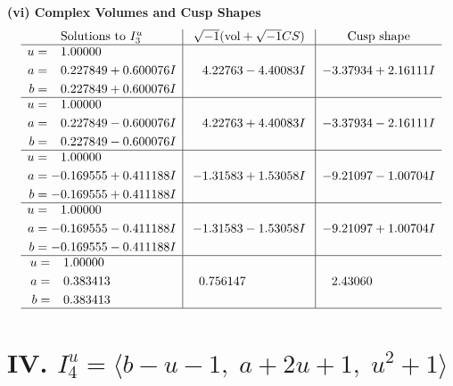 \documentclass[1p]{elsarticle_modified}
\theoremstyle{definition}
\newcommand{\I}{\sqrt{-1}}
\begin{document}
\newpage\flushleft \textbf{(vi) Complex Volumes and Cusp Shapes}
$$\begin{array}{c|c|c}  
\text{Solutions to }I^u_{3}& \I (\text{vol} + \sqrt{-1}CS) & \text{Cusp shape}\\
 \hline 
\begin{aligned}
u &= \phantom{-}1.00000\phantom{ +0.000000I} \\
a &= \phantom{-}0.227849 + 0.600076 I \\
b &= \phantom{-}0.227849 + 0.600076 I\end{aligned}
 & \phantom{-}4.22763 - 4.40083 I & -3.37934 + 2.16111 I \\ \hline\begin{aligned}
u &= \phantom{-}1.00000\phantom{ +0.000000I} \\
a &= \phantom{-}0.227849 - 0.600076 I \\
b &= \phantom{-}0.227849 - 0.600076 I\end{aligned}
 & \phantom{-}4.22763 + 4.40083 I & -3.37934 - 2.16111 I \\ \hline\begin{aligned}
u &= \phantom{-}1.00000\phantom{ +0.000000I} \\
a &= -0.169555 + 0.411188 I \\
b &= -0.169555 + 0.411188 I\end{aligned}
 & -1.31583 + 1.53058 I & -9.21097 - 1.00704 I \\ \hline\begin{aligned}
u &= \phantom{-}1.00000\phantom{ +0.000000I} \\
a &= -0.169555 - 0.411188 I \\
b &= -0.169555 - 0.411188 I\end{aligned}
 & -1.31583 - 1.53058 I & -9.21097 + 1.00704 I \\ \hline\begin{aligned}
u &= \phantom{-}1.00000\phantom{ +0.000000I} \\
a &= \phantom{-}0.383413\phantom{ +0.000000I} \\
b &= \phantom{-}0.383413\phantom{ +0.000000I}\end{aligned}
 & \phantom{-}0.756147\phantom{ +0.000000I} & \phantom{-}2.43060\phantom{ +0.000000I}\\
 \hline 
 \end{array}$$\newpage\newpage\renewcommand{\arraystretch}{1}
\centering \section*{IV. $I^u_{4}= \langle b- u-1,\;a+2 u+1,\;u^2+1 \rangle$}
\end{document}
